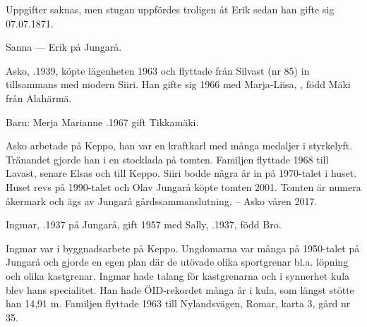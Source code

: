 Uppgifter saknas, men stugan uppfördes troligen åt Erik sedan han gifte sig 07.07.1871.

Sanna   ---  Erik  på Jungarå.



%



%
Asko, .1939, köpte lägenheten 1963 och flyttade från Silvast (nr 85) in tillsammans med modern Siiri. Han gifte sig 1966 med Marja-Liisa, , född Mäki från Alahärmä.

Barn: Merja Marianne .1967 gift Tikkamäki.

Asko arbetade på Keppo, han var en kraftkarl med många medaljer i styrkelyft. Tränandet gjorde han i en stocklada på tomten. Familjen flyttade 1968 till Lavast, senare Elsas och till Keppo. Siiri bodde några år in på 1970-talet i huset. Huset revs på 1990-talet och Olav Jungarå köpte tomten 2001. Tomten är numera åkermark och ägs av Jungarå gårdssammanslutning. -- Asko \textdied våren 2017.


%
Ingmar, .1937 på Jungarå, gift 1957 med Sally, .1937, född Bro.
\begin{jhchildren}
  \item {}
  \item {}
  \item {}
  \item {}
  \item {}
\end{jhchildren}
Ingmar var i byggnadsarbete på Keppo. Ungdomarna var många på 1950-talet på Jungarå och gjorde en egen plan där de utövade olika sportgrenar bl.a. löpning och olika kastgrenar. Ingmar hade talang för kastgrenarna och i synnerhet kula blev hans specialitet. Han hade ÖID-rekordet många år i kula, som längst stötte han 14,91 m. Familjen flyttade 1963 till Nylandsvägen, Romar, karta 3, gård nr 35.


